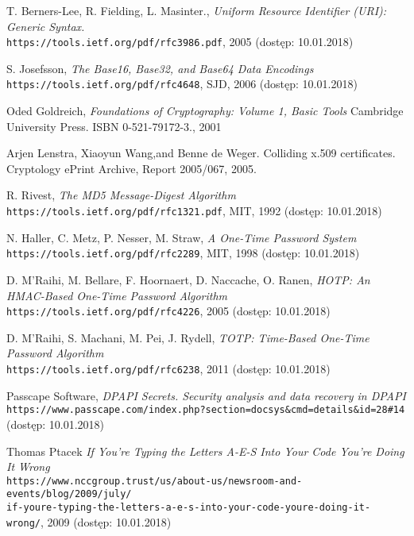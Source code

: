 \begin{thebibliography}{9}

T. Berners-Lee, R. Fielding, L. Masinter.,
\textit{Uniform Resource Identifier (URI): Generic Syntax.} \\ 
\texttt{https://tools.ietf.org/pdf/rfc3986.pdf}, 2005 (dostęp: 10.01.2018)

S. Josefsson,
\textit{The Base16, Base32, and Base64 Data Encodings} \\ 
\texttt{https://tools.ietf.org/pdf/rfc4648}, SJD, 2006 (dostęp: 10.01.2018)

Oded Goldreich,
\textit{Foundations of Cryptography: Volume 1, Basic Tools}  
Cambridge University Press. ISBN 0-521-79172-3., 2001

Arjen Lenstra, Xiaoyun Wang,and Benne de Weger. Colliding
x.509 certificates. Cryptology ePrint Archive, Report 2005/067,
2005.

R. Rivest,
\textit{The MD5 Message-Digest Algorithm} \\ 
\texttt{https://tools.ietf.org/pdf/rfc1321.pdf}, MIT, 1992 (dostęp: 10.01.2018)

N. Haller, C. Metz, P. Nesser, M. Straw, 
\textit{A One-Time Password System} \\ 
\texttt{https://tools.ietf.org/pdf/rfc2289}, MIT, 1998 (dostęp: 10.01.2018)

D. M'Raihi, M. Bellare, F. Hoornaert, D. Naccache, O. Ranen, 
\textit{HOTP: An HMAC-Based One-Time Password Algorithm} \\ 
\texttt{https://tools.ietf.org/pdf/rfc4226}, 2005 (dostęp: 10.01.2018)

D. M'Raihi, S. Machani, M. Pei, J. Rydell,
\textit{TOTP: Time-Based One-Time Password Algorithm} \\ 
\texttt{https://tools.ietf.org/pdf/rfc6238}, 2011 (dostęp: 10.01.2018)

Passcape Software,
\textit{DPAPI Secrets. Security analysis and data recovery in DPAPI} \\ 
\texttt{https://www.passcape.com/index.php?section=docsys\&cmd=details\&id=28\#14} (dostęp: 10.01.2018)

Thomas Ptacek
\textit{If You’re Typing the Letters A-E-S Into Your Code You’re Doing It Wrong} \\ 
\texttt{https://www.nccgroup.trust/us/about-us/newsroom-and-events/blog/2009/july/ \\if-youre-typing-the-letters-a-e-s-into-your-code-youre-doing-it-wrong/}, 2009 (dostęp: 10.01.2018)


\end{thebibliography}
